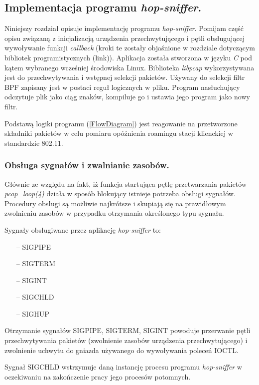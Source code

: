 \subsection{Implementacja programu \emph{hop-sniffer}.}

Niniejszy rozdział opisuje implementację programu \emph{hop-sniffer}. Pomijam część opisu związaną z inicjalizacją urządzenia przechwytującego i pętli obsługującej wywoływanie funkcji \emph{callback} (kroki te zostały objaśnione w rozdziale dotyczącym bibliotek programistycznych (link)). Aplikacja została stworzona w języku \emph{C} pod kątem wybranego wcześniej środowiska Linux. Biblioteka \emph{libpcap} wykorzystywana jest do przechwytywania i wstępnej selekcji pakietów. Używany do selekcji filtr BPF zapisany jest w postaci reguł logicznych w pliku. Program nasłuchujący odczytuje plik jako ciąg znaków, kompiluje go i ustawia jego program jako nowy filtr.   

Podstawą logiki programu (\ref{FlowDiagram}) jest reagowanie na przetworzone składniki pakietów w celu pomiaru opóźnienia roamingu stacji klienckiej w standardzie 802.11.   

\subsubsection{Obsługa sygnałów i zwalnianie zasobów.}

Głównie ze względu na fakt, iż funkcja startująca pętlę przetwarzania pakietów \emph{pcap\_loop(4)} działa w sposób blokujący istnieje potrzeba obsługi sygnałów. Procedury obsługi są możliwie najkrótsze i skupiają się na prawidłowym zwolnieniu zasobów w przypadku otrzymania określonego typu sygnału. 

Sygnały obsługiwane przez aplikację \emph{hop-sniffer} to:
\begin{itemize}
\item[--] SIGPIPE
\item[--] SIGTERM
\item[--] SIGINT
\item[--] SIGCHLD
\item[--] SIGHUP
\end{itemize}

Otrzymanie sygnałów SIGPIPE, SIGTERM, SIGINT powoduje przerwanie pętli przechwytywania pakietów (zwolnienie zasobów urządzenia przechwytującego) i zwolnienie uchwytu do gniazda używanego do wywoływania poleceń IOCTL. 

Sygnał SIGCHLD wstrzymuje daną instancję procesu programu \emph{hop-sniffer} w oczekiwaniu na zakończenie pracy jego procesów potomnych. 

